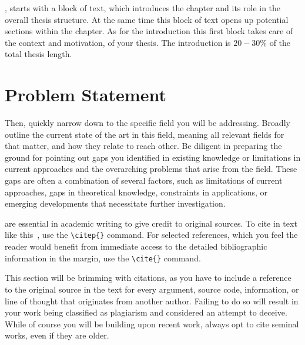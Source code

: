 , starts with a block of text, which introduces the chapter and its role in the overall thesis structure. 
At the same time this block of text opens up potential sections within the chapter. As for the introduction this first block takes care 
of the context and motivation, of your thesis. The introduction is $20 - 30\%$ of the total thesis length. 


\bigskip
\section{Problem Statement}\label{sec:ProblemStatement}
 Then, quickly narrow down to the specific field you will be addressing.
Broadly outline the current state of the art in this field, meaning all relevant fields for that matter, and how they relate to reach other. Be diligent in preparing the ground for pointing out
gaps you identified in existing knowledge or limitations in current approaches and the overarching problems that arise from the field. 
These gaps are often a combination of several factors, such as limitations of current approaches, gaps in theoretical knowledge, constraints in applications, 
or emerging developments that necessitate further investigation. 

 are essential in academic writing to give credit to original sources. 
To cite in text like this~\citep{SchuteraBachelorThesis}, 
use the \texttt{\textbackslash citep\{\}} command.
For selected references\cite{SchuteraBachelorThesis}, which you feel the reader would benefit from 
immediate access to the detailed bibliographic information in the margin, 
use the \texttt{\textbackslash cite\{\}} command.

This section will be brimming with citations, as you have to include a reference to the original source in the text for every argument, source code, information, or line of thought that originates from another author.
Failing to do so will result in your work being classified as plagiarism and considered an attempt to deceive. While of course you will be building upon
recent work, always opt to cite seminal works, even if they are older.






